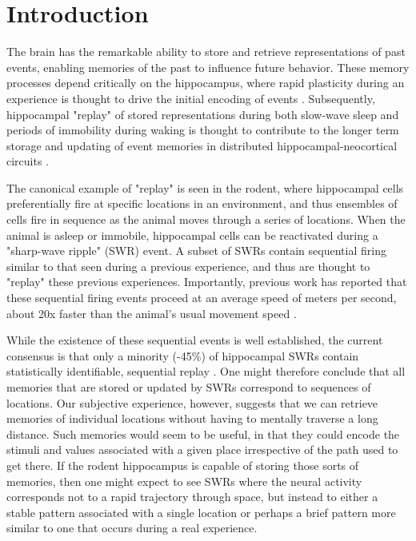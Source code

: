 \documentclass[9pt,lineno]{elife}
\begin{document}
\section*{Introduction}

The brain has the remarkable ability to store and retrieve representations of past events, enabling memories of the past to influence future behavior. These memory processes depend critically on the hippocampus, where rapid plasticity during an experience is thought to drive the initial encoding of events \citep{EichenbaumConditioningConsciousRecollection2004}. Subsequently, hippocampal "replay" of stored representations during both slow-wave sleep and periods of immobility during waking is thought to contribute to the longer term storage and updating of event memories in distributed hippocampal-neocortical circuits \citep{Franklandorganizationrecentremote2005, CarrHippocampalreplayawake2011, Joohippocampalsharpwave2018}. 

The canonical example of "replay" is seen in the rodent, where hippocampal cells preferentially fire at specific locations in an environment, and thus ensembles of cells fire in sequence as the animal moves through a series of locations. When the animal is asleep or immobile, hippocampal cells can be reactivated during a "sharp-wave ripple" (SWR) event. A subset of SWRs contain sequential firing similar to that seen during a previous experience, and thus are thought to "replay" these previous experiences. Importantly, previous work has reported that these sequential firing events proceed at an average speed of  meters per second, about 20x faster than the animal's usual movement speed \citep{NadasdyReplayTimeCompression1999, LeeMemorySequentialExperience2002, DavidsonHippocampalReplayExtended2009, KarlssonAwakereplayremote2009}. 

While the existence of these sequential events is well established, the current consensus is that only a minority (-45\%) of hippocampal SWRs contain statistically identifiable, sequential replay \citep{DavidsonHippocampalReplayExtended2009, MichonPostlearningHippocampalReplay2019,
ShinDynamicsAwakeHippocampalPrefrontal2019, KaeferReplayBehavioralSequences2020, Tingleymethodsreactivationreplay2020}. One might therefore conclude that all memories that are stored or updated by SWRs correspond to sequences of locations. Our subjective experience, however, suggests that we can retrieve memories of individual locations without having to mentally traverse a long distance. Such memories would seem to be useful, in that they could encode the stimuli and values associated with a given place irrespective of the path used to get there. If the rodent hippocampus is capable of storing those sorts of memories, then one might expect to see SWRs where the neural activity corresponds not to a rapid trajectory through space, but instead to either a stable pattern associated with a single location or perhaps a brief pattern more similar to one that occurs during a real experience.
\end{document}
